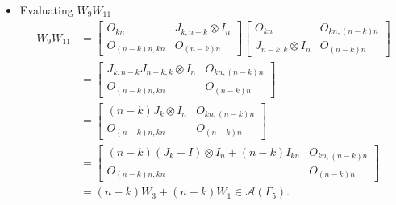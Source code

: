 \begin{itemize}
\item Evaluating $W_{9}W_{11}$
\begin{align*}
    W_9W_{11}
    &= \begin{bmatrix}
        O_{kn} & J_{k,n-k} \otimes I_n \\
        O_{(n-k)n,kn} & O_{(n-k)n}
    \end{bmatrix}
    \begin{bmatrix}
        O_{kn} & O_{kn, (n-k)n} \\
        J_{n-k, k}\otimes I_n & O_{(n-k)n}
    \end{bmatrix}\\
    &= \begin{bmatrix}
        J_{k,n-k}J_{n-k,k} \otimes I_n & O_{kn, (n-k)n} \\
        O_{(n-k)n,kn} & O_{(n-k)n}
    \end{bmatrix}\\
    &= \begin{bmatrix}
        (n-k)J_k\otimes I_n & O_{kn, (n-k)n} \\
        O_{(n-k)n,kn} & O_{(n-k)n}
    \end{bmatrix}\\
    &= \begin{bmatrix}
        (n-k)(J_k-I)\otimes I_n + (n-k)I_{kn} & O_{kn, (n-k)n} \\
        O_{(n-k)n,kn} & O_{(n-k)n}
    \end{bmatrix}\\
    &= (n-k)W_3 + (n-k)W_1\in\mathcal{A}(\Gamma_5).
\end{align*}


\end{itemize}
